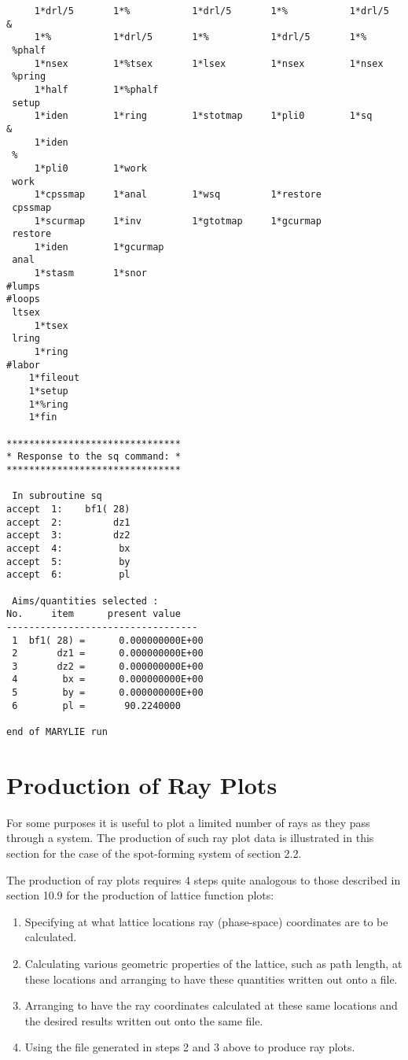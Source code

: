 \begin{footnotesize}
\begin{verbatim}
     1*drl/5       1*%           1*drl/5       1*%           1*drl/5    &
     1*%           1*drl/5       1*%           1*drl/5       1*%
 %phalf
     1*nsex        1*%tsex       1*lsex        1*nsex        1*nsex
 %pring
     1*half        1*%phalf
 setup
     1*iden        1*ring        1*stotmap     1*pli0        1*sq       &
     1*iden
 %
     1*pli0        1*work
 work
     1*cpssmap     1*anal        1*wsq         1*restore
 cpssmap
     1*scurmap     1*inv         1*gtotmap     1*gcurmap
 restore
     1*iden        1*gcurmap
 anal
     1*stasm       1*snor
#lumps
#loops
 ltsex
     1*tsex
 lring
     1*ring
#labor
    1*fileout
    1*setup
    1*%ring
    1*fin

*******************************
* Response to the sq command: *
*******************************

 In subroutine sq
accept  1:    bf1( 28)
accept  2:         dz1
accept  3:         dz2
accept  4:          bx
accept  5:          by
accept  6:          pl

 Aims/quantities selected :
No.     item      present value
----------------------------------
 1  bf1( 28) =      0.000000000E+00
 2       dz1 =      0.000000000E+00
 3       dz2 =      0.000000000E+00
 4        bx =      0.000000000E+00
 5        by =      0.000000000E+00
 6        pl =       90.2240000

end of MARYLIE run
\end{verbatim}
\end{footnotesize}

\section{Production of Ray Plots} 
\label{prodray}
For some purposes it is useful to plot a limited number of rays as they
pass through a system.  The production of such ray plot data is
illustrated in this section for the case of the spot-forming system of
section 2.2.

The production of ray plots requires 4 steps quite analogous to those
described in section 10.9 for the production of lattice function plots:
\begin{enumerate}
\item Specifying at what lattice locations ray (phase-space) coordinates
are to be calculated.
\item Calculating various geometric properties of the lattice, such as
path length, at these locations and arranging to have these
quantities written out onto a file.
\item Arranging to have the ray coordinates calculated at these same locations
and the desired results written out onto the same file.
\item Using the file generated in steps 2 and 3 above to produce ray plots.
\end{enumerate}

